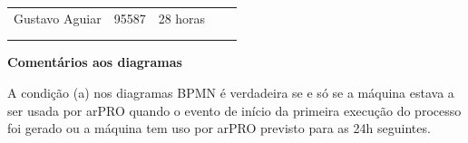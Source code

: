 \documentclass{article}
\begin{document}
\begin{table}[H]
\begin{tabular}{|l|l|l|l|l}
        \multicolumn{1}{|c|}{Gustavo Aguiar}     & \multicolumn{1}{c|}{95587}  & \multicolumn{1}{c|}{28 horas}                     & \multicolumn{1}{l|}{}                   &  \\
        \multicolumn{1}{|l|}{}                   & \multicolumn{1}{l|}{}       & \multicolumn{1}{l|}{}                             & \multicolumn{1}{l|}{}                   &  \\
        \multicolumn{1}{|l|}{}                   & \multicolumn{1}{l|}{}       & \multicolumn{1}{l|}{}                             & \multicolumn{1}{l|}{}                   & \\ \cline{1-4}
        \end{tabular}
        \end{table}

    \vspace{0.5cm}

    \noindent \large \textbf{Comentários aos diagramas}

    \vspace{0.4cm}
    \normalsize

    A condição (a) nos diagramas BPMN é verdadeira se e só se  a máquina estava a ser usada por arPRO quando o evento de início da primeira execução do processo foi gerado ou a máquina tem uso por arPRO previsto para as 24h seguintes.


    \pagebreak
    \pdfpageattr\expandafter{\the\pdfpageattr/Rotate -90}
\end{document}
